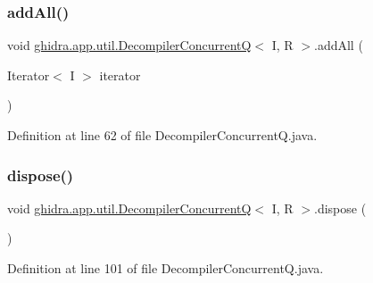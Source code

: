 \subsubsection{\texorpdfstring{addAll()}{addAll()}\hspace{0.1cm}{\footnotesize\ttfamily [2/2]}}
{\footnotesize\ttfamily void \mbox{\hyperlink{classghidra_1_1app_1_1util_1_1_decompiler_concurrent_q}{ghidra.\+app.\+util.\+Decompiler\+ConcurrentQ}}$<$ I, R $>$.add\+All (\begin{DoxyParamCaption}\item[{Iterator$<$ I $>$}]{iterator }\end{DoxyParamCaption})\hspace{0.3cm}{\ttfamily [inline]}}



Definition at line 62 of file Decompiler\+Concurrent\+Q.\+java.

\mbox{\label{classghidra_1_1app_1_1util_1_1_decompiler_concurrent_q_accb27b719bd48ed28ed813d36b84e98e}} 
\subsubsection{\texorpdfstring{dispose()}{dispose()}\hspace{0.1cm}{\footnotesize\ttfamily [1/2]}}
{\footnotesize\ttfamily void \mbox{\hyperlink{classghidra_1_1app_1_1util_1_1_decompiler_concurrent_q}{ghidra.\+app.\+util.\+Decompiler\+ConcurrentQ}}$<$ I, R $>$.dispose (\begin{DoxyParamCaption}{ }\end{DoxyParamCaption})\hspace{0.3cm}{\ttfamily [inline]}}



Definition at line 101 of file Decompiler\+Concurrent\+Q.\+java.

